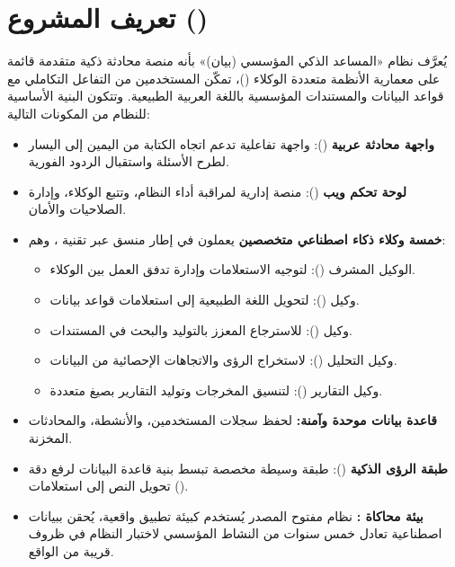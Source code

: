 \section{تعريف المشروع ()}
\label{sec:definition}

يُعرَّف نظام «المساعد الذكي المؤسسي (بيان)» بأنه منصة محادثة ذكية متقدمة قائمة
على معمارية الأنظمة متعددة الوكلاء ()، تمكّن المستخدمين
من التفاعل التكاملي مع قواعد البيانات والمستندات المؤسسية باللغة العربية
الطبيعية. وتتكون البنية الأساسية للنظام من المكونات التالية:

\begin{itemize}
  \item \textbf{واجهة محادثة عربية} (): واجهة تفاعلية تدعم اتجاه
        الكتابة من اليمين إلى اليسار لطرح الأسئلة واستقبال الردود الفورية.
  \item \textbf{لوحة تحكم ويب} (): منصة إدارية لمراقبة
        أداء النظام، وتتبع الوكلاء، وإدارة الصلاحيات والأمان.
  \item \textbf{خمسة وكلاء ذكاء اصطناعي متخصصين} يعملون في إطار منسق عبر
        تقنية ، وهم:
    \begin{itemize}
      \item الوكيل المشرف (): لتوجيه الاستعلامات
            وإدارة تدفق العمل بين الوكلاء.
      \item وكيل  (): لتحويل اللغة الطبيعية إلى
            استعلامات قواعد بيانات.
      \item وكيل  (): للاسترجاع المعزز بالتوليد
            والبحث في المستندات.
      \item وكيل التحليل (): لاستخراج الرؤى والاتجاهات
            الإحصائية من البيانات.
      \item وكيل التقارير (): لتنسيق المخرجات وتوليد
            التقارير بصيغ متعددة.
    \end{itemize}
  \item \textbf{قاعدة بيانات موحدة وآمنة:} لحفظ سجلات المستخدمين، والأنشطة،
        والمحادثات المخزنة.
  \item \textbf{طبقة الرؤى الذكية} (): طبقة وسيطة مخصصة
        تبسط بنية قاعدة البيانات لرفع دقة تحويل النص إلى استعلامات
        ().
  \item \textbf{بيئة محاكاة :} نظام  مفتوح المصدر يُستخدم
        كبيئة تطبيق واقعية، يُحقن ببيانات اصطناعية تعادل خمس سنوات من النشاط المؤسسي
        لاختبار النظام في ظروف قريبة من الواقع.
\end{itemize}

